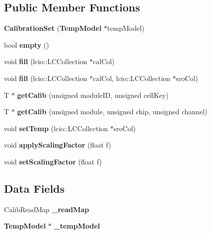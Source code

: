\subsection*{Public Member Functions}
\begin{DoxyCompactItemize}
\item 
{\bfseries CalibrationSet} ({\bf TempModel} $\ast$tempModel)\label{classCALICE_1_1CalibrationSet_a5b3dc2a9fee4bb05ead1f6aecb63e508}

\item 
bool {\bfseries empty} ()\label{classCALICE_1_1CalibrationSet_acf72ce0c2908ad7c57c1a4fed2e0ae69}

\item 
void {\bfseries fill} (lcio::LCCollection $\ast$calCol)\label{classCALICE_1_1CalibrationSet_af6eada4b282e59cd26830121ffe431ad}

\item 
void {\bfseries fill} (lcio::LCCollection $\ast$calCol, lcio::LCCollection $\ast$sroCol)\label{classCALICE_1_1CalibrationSet_a5064acda09ac4e6f60dfd8c95575bb77}

\item 
T $\ast$ {\bfseries getCalib} (unsigned moduleID, unsigned cellKey)\label{classCALICE_1_1CalibrationSet_ab7ccb1fe35ac7634ea52412ae96da4e5}

\item 
T $\ast$ {\bfseries getCalib} (unsigned module, unsigned chip, unsigned channel)\label{classCALICE_1_1CalibrationSet_a0e439372aeaa7d78b6fbcf0886022f1e}

\item 
void {\bfseries setTemp} (lcio::LCCollection $\ast$sroCol)\label{classCALICE_1_1CalibrationSet_a5dcbfc885e768814df5ffb3309173322}

\item 
void {\bfseries applyScalingFactor} (float f)\label{classCALICE_1_1CalibrationSet_aba2e28745da6330c981810dd5e21f0ae}

\item 
void {\bfseries setScalingFactor} (float f)\label{classCALICE_1_1CalibrationSet_aefc2753764d779cd34362c8a5f8b6943}

\end{DoxyCompactItemize}
\subsection*{Data Fields}
\begin{DoxyCompactItemize}
\item 
CalibReadMap {\bfseries \_\-readMap}\label{classCALICE_1_1CalibrationSet_a57c533ff2868f73cf2029d32568b3e20}

\item 
{\bf TempModel} $\ast$ {\bfseries \_\-tempModel}\label{classCALICE_1_1CalibrationSet_a1076b184fc1d2ae4bb05f204fbe07f34}

\end{DoxyCompactItemize}
